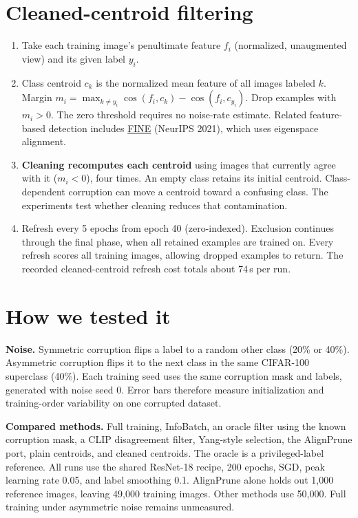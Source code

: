 \documentclass[10pt]{article}
\begin{document}
\section{Cleaned-centroid filtering}
\begin{enumerate}
\item Take each training image's penultimate feature $f_i$ (normalized, unaugmented view) and its given label $y_i$.
\item Class centroid $c_k$ is the normalized mean feature of all images labeled $k$. Margin $m_i = \max_{k\neq y_i}\cos(f_i,c_k) - \cos(f_i,c_{y_i})$. Drop examples with $m_i > 0$. The zero threshold requires no noise-rate estimate. Related feature-based detection includes \href{https://arxiv.org/abs/2102.11628}{FINE} (NeurIPS 2021), which uses eigenspace alignment.
\item \textbf{Cleaning recomputes each centroid} using images that currently agree with it ($m_i<0$), four times. An empty class retains its initial centroid. Class-dependent corruption can move a centroid toward a confusing class. The experiments test whether cleaning reduces that contamination.
\item Refresh every 5 epochs from epoch 40 (zero-indexed). Exclusion continues through the final phase, when all retained examples are trained on. Every refresh scores all training images, allowing dropped examples to return. The recorded cleaned-centroid refresh cost totals about 74\,s per run.
\end{enumerate}

\section{How we tested it}
\textbf{Noise.} Symmetric corruption flips a label to a random other class (20\% or 40\%). Asymmetric corruption flips it to the next class in the same CIFAR-100 superclass (40\%). Each training seed uses the same corruption mask and labels, generated with noise seed 0. Error bars therefore measure initialization and training-order variability on one corrupted dataset.

\textbf{Compared methods.} Full training, InfoBatch, an oracle filter using the known corruption mask, a CLIP disagreement filter, Yang-style selection, the AlignPrune port, plain centroids, and cleaned centroids. The oracle is a privileged-label reference. All runs use the shared ResNet-18 recipe, 200 epochs, SGD, peak learning rate 0.05, and label smoothing 0.1. AlignPrune alone holds out 1{,}000 reference images, leaving 49{,}000 training images. Other methods use 50{,}000. Full training under asymmetric noise remains unmeasured.
\end{document}
